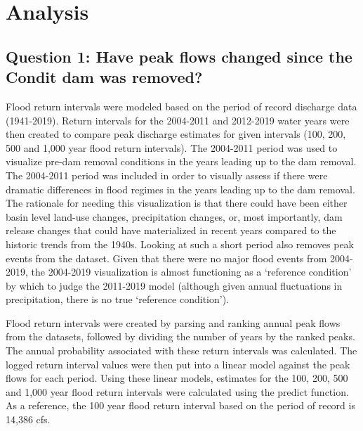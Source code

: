 \documentclass[
  12pt,
]{article}
\begin{document}
\newpage

\hypertarget{analysis}{%
\section{Analysis}\label{analysis}}

\hypertarget{question-1-have-peak-flows-changed-since-the-condit-dam-was-removed}{%
\subsection{Question 1: Have peak flows changed since the Condit dam was
removed?}\label{question-1-have-peak-flows-changed-since-the-condit-dam-was-removed}}

Flood return intervals were modeled based on the period of record
discharge data (1941-2019). Return intervals for the 2004-2011 and
2012-2019 water years were then created to compare peak discharge
estimates for given intervals (100, 200, 500 and 1,000 year flood return
intervals). The 2004-2011 period was used to visualize pre-dam removal
conditions in the years leading up to the dam removal. The 2004-2011
period was included in order to visually assess if there were dramatic
differences in flood regimes in the years leading up to the dam removal.
The rationale for needing this visualization is that there could have
been either basin level land-use changes, precipitation changes, or,
most importantly, dam release changes that could have materialized in
recent years compared to the historic trends from the 1940s. Looking at
such a short period also removes peak events from the dataset. Given
that there were no major flood events from 2004-2019, the 2004-2019
visualization is almost functioning as a `reference condition' by which
to judge the 2011-2019 model (although given annual fluctuations in
precipitation, there is no true `reference condition').

Flood return intervals were created by parsing and ranking annual peak
flows from the datasets, followed by dividing the number of years by the
ranked peaks. The annual probability associated with these return
intervals was calculated. The logged return interval values were then
put into a linear model against the peak flows for each period. Using
these linear models, estimates for the 100, 200, 500 and 1,000 year
flood return intervals were calculated using the predict function. As a
reference, the 100 year flood return interval based on the period of
record is 14,386 cfs.
\end{document}
